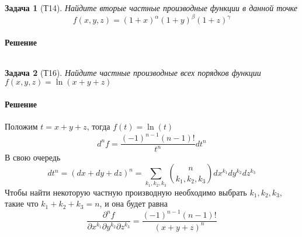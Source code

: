\documentclass[a4paper,12pt]{report}
\newtheorem{problem}{Задача}[]
\newenvironment{sol}{\paragraph{Решение}}{}
\begin{document}
	
	\newpage
    
    \begin{problem}[Т14]
        Найдите вторые частные производные функции в данной точке
        \begin{equation*}
            f(x,y,z)=(1+x)^{\alpha}(1+y)^{\beta}(1+z)^{\gamma}
        \end{equation*}
    \end{problem}
    \begin{sol}
        \begin{equation}
            
        \end{equation}
    \end{sol}
	
    \begin{problem}[Т16]
        Найдите частные производные всех порядков функции $f(x,y,z)=\ln{(x+y+z)}$
    \end{problem}
    \begin{sol}
        Положим $t=x+y+z$, тогда $f(t)=\ln(t)$
        \begin{equation}
            d^nf=\frac{(-1)^{n-1}(n-1)!}{t^n}dt^n
        \end{equation}
        В свою очередь 
        \begin{equation}
            dt^n=(dx+dy+dz)^n=\displaystyle\sum_{k_1,k_2,k_3}^{}{n\choose k_1,k_2,k_3}dx^{k_1}dy^{k_2}dz^{k_3}
        \end{equation}
        Чтобы найти некоторую частную производную необходимо выбрать $k_1,k_2,k_3$, такие что $k_1+k_2+k_3=n$, и она будет равна
        \begin{equation}
            \frac{\partial^n f}{\partial x^{k_1}\partial y^{k_2}\partial z^{k_3}}=\frac{(-1)^{n-1}(n-1)!}{(x+y+z)^n}
        \end{equation}
    \end{sol}
    
\end{document}
